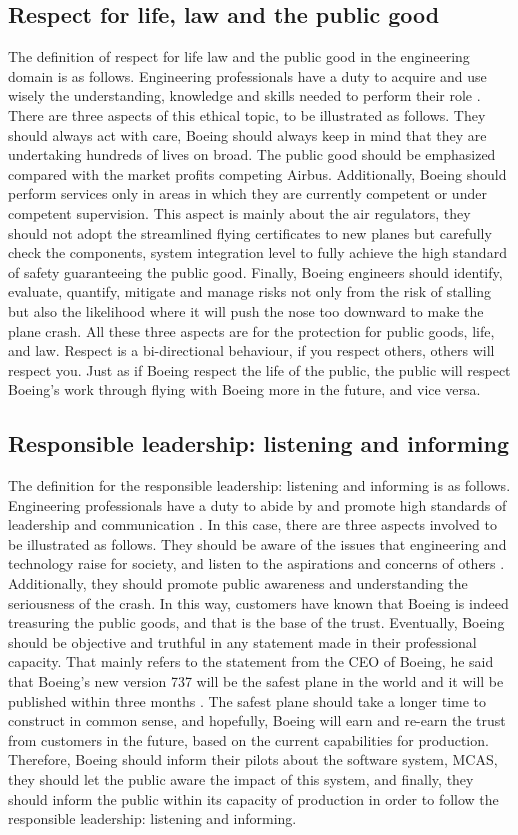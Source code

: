 \documentclass{article}
\begin{document}
\subsection{Respect for life, law and the public good}
The definition of respect for life law and the public good in the engineering domain is as follows. Engineering professionals have a duty to acquire and use wisely
the understanding, knowledge and skills needed to perform their
role \cite{Conseque99:online}. There are three aspects of this ethical topic, to be illustrated as follows. They should always act with care, Boeing should always keep in mind that they are undertaking hundreds of lives on broad. The public good should be emphasized compared with the market profits competing Airbus. Additionally, Boeing should perform services only in areas in which they are currently competent or under competent supervision.  This aspect is mainly about the air regulators, they should not adopt the streamlined flying certificates to new planes but carefully check the components, system integration level to fully achieve the high standard of safety guaranteeing the public good. Finally, Boeing engineers should identify, evaluate, quantify, mitigate and manage risks not only from the risk of stalling but also the likelihood where it will push the nose too downward to make the plane crash. All these three aspects are for the protection for public goods, life, and law. Respect is a bi-directional behaviour, if you respect others, others will respect you. Just as if Boeing respect the life of the public, the public will respect Boeing's work through flying with Boeing more in the future, and vice versa.
\subsection{Responsible leadership: listening and informing}
The definition for the responsible leadership: listening and informing is as follows. Engineering professionals have a duty to abide by and promote
high standards of leadership and communication \cite{statemen88:online}. In this case, there are three aspects involved to be illustrated as follows.
They should be aware of the issues that engineering and technology raise for
society, and listen to the aspirations and concerns of others \cite{statemen88:online}. Additionally, they should promote public awareness and understanding the seriousness of the crash. In this way, customers have known that Boeing is indeed treasuring the public goods, and that is the base of the trust. Eventually, Boeing should be objective and truthful in any statement made in their professional capacity. That mainly refers to the statement from the CEO of Boeing, he said that Boeing's new version 737 will be the safest plane in the world and it will be published within three months \cite{6BoeingC1:online}. The safest plane should take a longer time to construct in common sense, and hopefully, Boeing will earn and re-earn the trust from customers in the future, based on the current capabilities for production. Therefore, Boeing should inform their pilots about the software system, MCAS, they should let the public aware the impact of this system, and finally, they should inform the public within its capacity of production in order to follow the responsible leadership: listening and informing.
\end{document}
